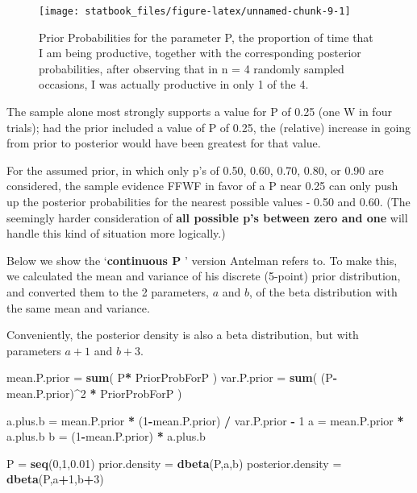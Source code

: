 \documentclass[]{book}
\newenvironment{Shaded}{\begin{snugshade}}{\end{snugshade}}
\newcommand{\DecValTok}[1]{\textcolor[rgb]{0.00,0.00,0.81}{#1}}
\newcommand{\FloatTok}[1]{\textcolor[rgb]{0.00,0.00,0.81}{#1}}
\newcommand{\KeywordTok}[1]{\textcolor[rgb]{0.13,0.29,0.53}{\textbf{#1}}}
\newcommand{\NormalTok}[1]{#1}
\newcommand{\OperatorTok}[1]{\textcolor[rgb]{0.81,0.36,0.00}{\textbf{#1}}}
\newcommand{\StringTok}[1]{\textcolor[rgb]{0.31,0.60,0.02}{#1}}
\begin{document}
\begin{figure}

{\centering \texttt{[image: statbook\_files/figure-latex/unnamed-chunk-9-1]} 

}

\caption{Prior Probabilities for the parameter P, the proportion of time that I am being productive, together with the corresponding posterior probabilities, after observing that in n = 4 randomly sampled occasions, I was actually productive in only 1 of the 4.}\label{fig:unnamed-chunk-9}
\end{figure}

The sample alone most strongly supports a value for P of 0.25 (one W in four trials); had the prior included a value of P of 0.25, the (relative) increase in going from prior to posterior would have been greatest for that value.

For the assumed prior, in which only p's of 0.50, 0.60, 0.70, 0.80, or 0.90 are considered, the sample evidence FFWF in favor of a P near 0.25 can only push up the posterior probabilities for the nearest possible values - 0.50 and 0.60. (The seemingly harder consideration of \textbf{all possible p's between zero and one} will handle this kind of situation more logically.)

Below we show the `\textbf{continuous P }' version Antelman refers to. To make this, we calculated the mean and variance of his discrete (5-point) prior distribution, and converted them to the 2 parameters, \(a\) and \(b\), of the beta distribution with the same mean and variance.

Conveniently, the posterior density is also a beta distribution, but with parameters \(a+1\) and \(b+3\).

\begin{Shaded}
\begin{Highlighting}[]
\NormalTok{mean.P.prior =}\StringTok{ }\KeywordTok{sum}\NormalTok{( P}\OperatorTok{*}\StringTok{ }\NormalTok{PriorProbForP )}
\NormalTok{var.P.prior  =}\StringTok{ }\KeywordTok{sum}\NormalTok{( (P}\OperatorTok{-}\NormalTok{mean.P.prior)}\OperatorTok{^}\DecValTok{2} \OperatorTok{*}\StringTok{ }\NormalTok{PriorProbForP )}

\NormalTok{a.plus.b =}\StringTok{ }\NormalTok{mean.P.prior }\OperatorTok{*}\StringTok{ }\NormalTok{(}\DecValTok{1}\OperatorTok{-}\NormalTok{mean.P.prior) }\OperatorTok{/}\StringTok{ }\NormalTok{var.P.prior  }\OperatorTok{-}\StringTok{ }\DecValTok{1}
\NormalTok{a =}\StringTok{ }\NormalTok{mean.P.prior }\OperatorTok{*}\StringTok{ }\NormalTok{a.plus.b}
\NormalTok{b =}\StringTok{ }\NormalTok{(}\DecValTok{1}\OperatorTok{-}\NormalTok{mean.P.prior) }\OperatorTok{*}\StringTok{ }\NormalTok{a.plus.b}

\NormalTok{P =}\StringTok{ }\KeywordTok{seq}\NormalTok{(}\DecValTok{0}\NormalTok{,}\DecValTok{1}\NormalTok{,}\FloatTok{0.01}\NormalTok{)}
\NormalTok{prior.density =}\StringTok{ }\KeywordTok{dbeta}\NormalTok{(P,a,b)}
\NormalTok{posterior.density =}\StringTok{ }\KeywordTok{dbeta}\NormalTok{(P,a}\OperatorTok{+}\DecValTok{1}\NormalTok{,b}\OperatorTok{+}\DecValTok{3}\NormalTok{)}
\end{Highlighting}
\end{Shaded}
\end{document}
